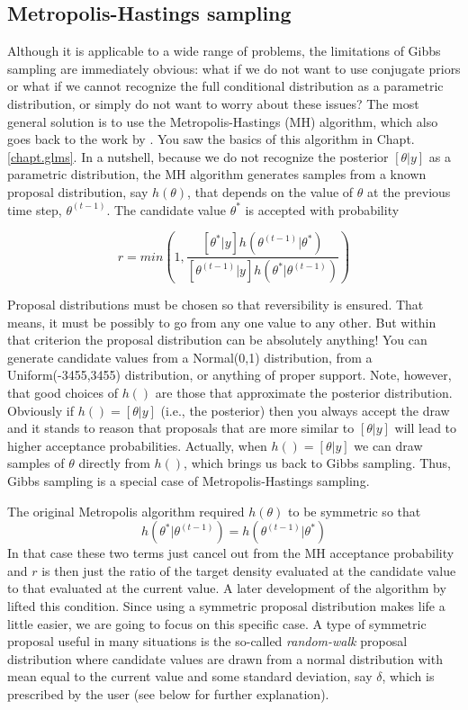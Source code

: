 \subsection{ Metropolis-Hastings sampling   }
\label{mcmc.sec.mh}

Although it is applicable to a wide range of problems, the limitations
of Gibbs sampling are immediately obvious: what if we do not want to
use conjugate priors or what if we cannot recognize the full
conditional distribution as a parametric distribution, or simply do
not want to worry about these issues? The most general solution is to
use the Metropolis-Hastings (MH) algorithm, which also goes back to
the work by \citet{metropolis_ulam:1953}. You saw the basics of this
algorithm in Chapt. \ref{chapt.glms}. In a nutshell, because we do not recognize the
posterior $[\theta|y]$ as a parametric distribution, the MH algorithm
generates samples from a known proposal distribution, say $h(\theta)$,
that depends on the value of $\theta$ at the previous time step,  $\theta^{(t-1)}$. The candidate value $\theta^*$ is accepted with probability

\[
r = min(1, \frac{[\theta^{*}|y] h(\theta^{(t-1)}|\theta^{*}) }
		{ [\theta^{(t-1)}|y] h(\theta^{*}|\theta^{(t-1)})} )
    
\]

Proposal distributions must be chosen so that reversibility is ensured. That means, it must be possibly to go from any one value to any other. But within that criterion the proposal distribution can be absolutely
anything! You can generate candidate values from a Normal(0,1)
distribution, from a Uniform(-3455,3455) distribution, or anything of
proper support.  Note, however, that good choices of $h()$ are those
that approximate the posterior distribution. Obviously if $h() =
[\theta|y]$ (i.e., the posterior) then you always accept the draw
and it stands to reason that proposals that are more similar to
$[\theta|y]$ will lead to higher acceptance probabilities. Actually, when $h() =
[\theta|y]$ we can draw samples of $\theta$ directly from $h()$, which brings us back to Gibbs sampling. Thus, Gibbs sampling is a special case of Metropolis-Hastings sampling. 


The original Metropolis algorithm
required $h(\theta)$ to be symmetric so that
\[
h(\theta^{*}|\theta^{(t-1)}) = h(\theta^{(t-1)}|\theta^{*})
\]
In that case these two terms just cancel
out from the MH acceptance probability and $r$ is then just the ratio
of the target density evaluated at the candidate value to that
evaluated at the current value. A later
development of the algorithm by \citet{hastings:1970} lifted this
condition.
Since using a symmetric proposal distribution makes life a little
easier, we are going to focus on this specific case. A type of symmetric proposal useful in many situations is the
so-called {\it random-walk} proposal distribution where candidate values
are drawn from a normal distribution with mean equal to the current
value and some standard deviation, say $\delta$, which is prescribed by
the user (see below for further explanation).

